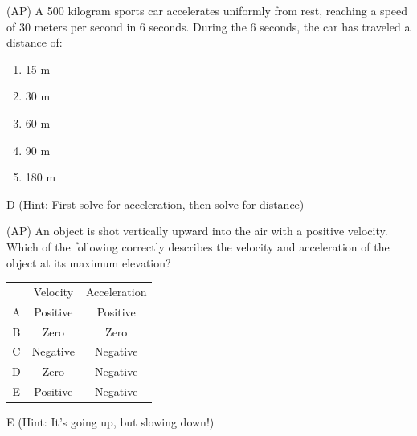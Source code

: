\begin{question}
(AP) A 500 kilogram sports car accelerates uniformly from rest, reaching a speed of 30 meters per second in 6 seconds. During the 6 seconds, the car has traveled a distance of:
\begin{multicols}{5}
\begin{enumerate}[label=(\alph*)]
    \item 15 m
    \item 30 m
    \item 60 m
    \item 90 m
    \item 180 m
\end{enumerate}
\end{multicols}
\end{question}

\begin{solution}
D (Hint: First solve for acceleration, then solve for distance)
\end{solution}



\begin{question}
(AP) An object is shot vertically upward into the air with a positive velocity. Which of the following correctly describes the velocity and acceleration of the object at its maximum elevation?

\begin{tabular}{ |c|c|c| } 
\hline
       & Velocity & Acceleration \\ 
 A     & Positive & Positive \\ 
 B     & Zero & Zero \\ 
 C     & Negative & Negative \\ 
 D     & Zero & Negative \\ 
 E     & Positive & Negative \\
\end{tabular}

\end{question}

\begin{solution}
E (Hint: It's going up, but slowing down!)
\end{solution}

